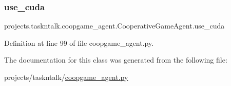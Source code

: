 \subsubsection{\texorpdfstring{use\+\_\+cuda}{use\_cuda}}
{\footnotesize\ttfamily projects.\+taskntalk.\+coopgame\+\_\+agent.\+Cooperative\+Game\+Agent.\+use\+\_\+cuda}



Definition at line 99 of file coopgame\+\_\+agent.\+py.



The documentation for this class was generated from the following file\+:\begin{DoxyCompactItemize}
\item 
projects/taskntalk/\hyperlink{coopgame__agent_8py}{coopgame\+\_\+agent.\+py}\end{DoxyCompactItemize}
